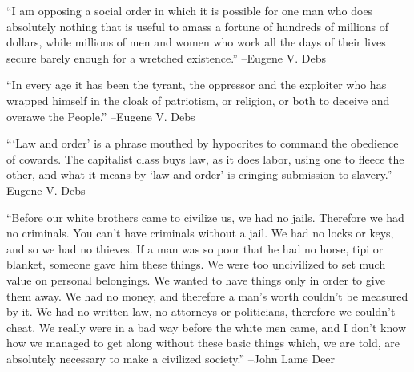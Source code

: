 \documentclass{article}%
\begin{document}
\linebreak%
\vspace{1mm}%
\begin{minipage}{\textwidth}%
\flushleft%
“I am opposing a social order in which it is possible for one man who does absolutely nothing that is useful to amass a fortune of hundreds of millions of dollars, while millions of men and women who work all the days of their lives secure barely enough for a wretched existence.”%
\linebreak%
\vspace{1mm}%
–Eugene V. Debs%
\linebreak%
\vspace{1mm}%
\end{minipage}%
\linebreak%
\vspace{1mm}%
\begin{minipage}{\textwidth}%
\flushleft%
“In every age it has been the tyrant, the oppressor and the exploiter who has wrapped himself in the cloak of patriotism, or religion, or both to deceive and overawe the People.”%
\linebreak%
\vspace{1mm}%
–Eugene V. Debs%
\linebreak%
\vspace{1mm}%
\end{minipage}%
\linebreak%
\vspace{1mm}%
\begin{minipage}{\textwidth}%
\flushleft%
“‘Law and order’ is a phrase mouthed by hypocrites to command the obedience of cowards. The capitalist class buys law, as it does labor, using one to fleece the other, and what it means by ‘law and order’ is cringing submission to slavery.”%
\linebreak%
\vspace{1mm}%
–Eugene V. Debs%
\linebreak%
\vspace{1mm}%
\end{minipage}%
\linebreak%
\vspace{1mm}%
\begin{minipage}{\textwidth}%
\flushleft%
“Before our white brothers came to civilize us, we had no jails. Therefore we had no criminals. You can't have criminals without a jail. We had no locks or keys, and so we had no thieves. If a man was so poor that he had no horse, tipi or blanket, someone gave him these things. We were too uncivilized to set much value on personal belongings. We wanted to have things only in order to give them away. We had no money, and therefore a man's worth couldn't be measured by it. We had no written law, no attorneys or politicians, therefore we couldn't cheat. We really were in a bad way before the white men came, and I don't know how we managed to get along without these basic things which, we are told, are absolutely necessary to make a civilized society.”%
\linebreak%
\vspace{1mm}%
–John Lame Deer%
\linebreak%
\vspace{1mm}%
\end{minipage}%
\end{document}
